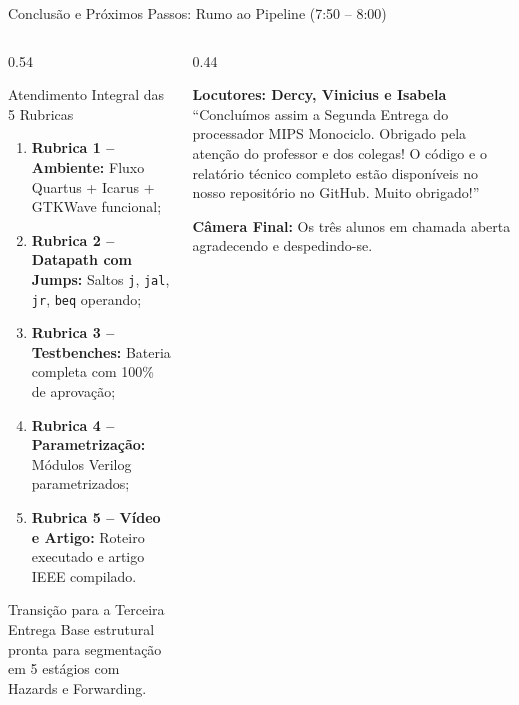 \documentclass[aspectratio=169, 10pt]{beamer}
\begin{document}
\begin{frame}{Conclusão e Próximos Passos: Rumo ao Pipeline (7:50 -- 8:00)}
  \begin{columns}[T]
    \begin{column}{0.54\textwidth}
      \begin{exampleblock}{Atendimento Integral das 5 Rubricas}
        \footnotesize
        \begin{enumerate}\setlength{\itemsep}{1pt}
          \item[\checkmark] \textbf{Rubrica 1 -- Ambiente:} Fluxo Quartus + Icarus + GTKWave funcional;
          \item[\checkmark] \textbf{Rubrica 2 -- Datapath com Jumps:} Saltos \texttt{j}, \texttt{jal}, \texttt{jr}, \texttt{beq} operando;
          \item[\checkmark] \textbf{Rubrica 3 -- Testbenches:} Bateria completa com 100\% de aprovação;
          \item[\checkmark] \textbf{Rubrica 4 -- Parametrização:} Módulos Verilog parametrizados;
          \item[\checkmark] \textbf{Rubrica 5 -- Vídeo e Artigo:} Roteiro executado e artigo IEEE compilado.
        \end{enumerate}
      \end{exampleblock}

      \begin{block}{Transição para a Terceira Entrega}
        \footnotesize
        Base estrutural pronta para segmentação em 5 estágios com Hazards e Forwarding.
      \end{block}
    \end{column}

    \begin{column}{0.44\textwidth}
      \begin{tcolorbox}[speakerbox]
        \textbf{Locutores: Dercy, Vinicius e Isabela}\\
        \vspace{1mm}
        \scriptsize
        ``Concluímos assim a Segunda Entrega do processador MIPS Monociclo.
        Obrigado pela atenção do professor e dos colegas!
        O código e o relatório técnico completo estão disponíveis no nosso repositório no GitHub. Muito obrigado!''
      \end{tcolorbox}

      \begin{tcolorbox}[cuebox]
        \textbf{Câmera Final:}
        Os três alunos em chamada aberta agradecendo e despedindo-se.
      \end{tcolorbox}
    \end{column}
  \end{columns}
\end{frame}
\end{document}

